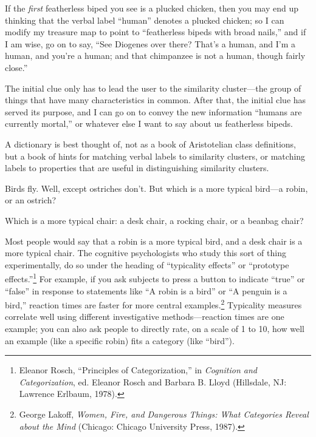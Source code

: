 { If the \textit{first} featherless biped you see is a plucked
chicken, then you may end up thinking that the verbal label
``human'' denotes a plucked chicken;
so I can modify my treasure map to point to
``featherless bipeds with broad
nails,'' and if I am wise, go on to say,
``See Diogenes over there? That's a
human, and I'm a human, and you're a
human; and that chimpanzee is not a human, though fairly
close.''


 The initial clue only has to lead the user to the similarity
cluster---the group of things that have many characteristics in common.
After that, the initial clue has served its purpose, and I can go on to
convey the new information ``humans are currently
mortal,'' or whatever else I want to say about us
featherless bipeds.


 A dictionary is best thought of, not as a book of Aristotelian
class definitions, but a book of hints for matching verbal labels to
similarity clusters, or matching labels to properties that are useful
in distinguishing similarity clusters.

\myendsectiontext



 Birds fly. Well, except ostriches don't. But which
is a more typical bird---a robin, or an ostrich? 


 Which is a more typical chair: a desk chair, a rocking chair, or a
beanbag chair?


 Most people would say that a robin is a more typical bird, and a
desk chair is a more typical chair. The cognitive psychologists who
study this sort of thing experimentally, do so under the heading of
``typicality effects'' or
``prototype
effects.''\footnote{Eleanor Rosch, ``Principles of
Categorization,'' in \textit{Cognition and
Categorization}, ed. Eleanor Rosch and Barbara B. Lloyd (Hillsdale, NJ:
Lawrence Erlbaum, 1978).} For example, if you ask
subjects to press a button to indicate
``true'' or
``false'' in response to statements
like ``A robin is a bird'' or
``A penguin is a bird,'' reaction
times are faster for more central examples.\footnote{George Lakoff, \textit{Women, Fire, and Dangerous Things: What
Categories Reveal about the Mind} (Chicago: Chicago University Press,
1987).}
Typicality measures correlate well using different investigative
methods---reaction times are one example; you can also ask people to
directly rate, on a scale of 1 to 10, how well an example (like a
specific robin) fits a category (like
``bird'').


}
